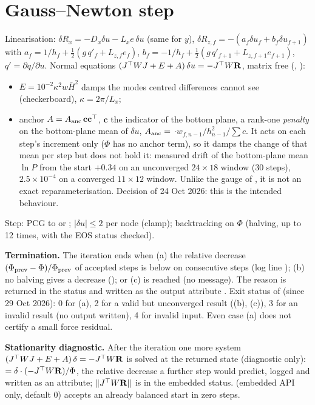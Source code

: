 \section{Gauss--Newton step}
Linearisation: $\delta R_x=-D_x\delta u-L_xe\,\delta u$ (same for $y$),
$\delta R_{z,f}=-(a_f\delta u_f+b_f\delta u_{f+1})$ with
$a_f=1/h_f+\tfrac12(g\,q'_f+L_{z,f}e_f)$, $b_f=-1/h_f+\tfrac12(g\,q'_{f+1}+L_{z,f+1}e_{f+1})$, $q'=\partial q/\partial u$.
Normal equations $(J^\top WJ+E+A)\,\delta u=-J^\top W\mathbf R$, matrix free (, ):
\begin{itemize}
\item $E=10^{-2}\kappa^2w\bar H^2$ damps the modes centred differences cannot see (checkerboard), $\kappa=2\pi/L_x$;
\item anchor $A=A_{\rm anc}\,\mathbf c\mathbf c^\top$, $\mathbf c$ the indicator of the bottom plane, a rank-one
\emph{penalty} on the bottom-plane mean of $\delta u$, $A_{\rm anc}=$ $\cdot w_{f,n-1}/h_{n-1}^2/\sum c$. It acts
on each step's increment only ($\Phi$ has no anchor term), so it damps the change of that mean per step but does not hold it:
measured drift of the bottom-plane mean $\ln P$ from the start $+0.34$ on an unconverged $24\times18$ window (30 steps),
$2.5\times10^{-4}$ on a converged $11\times12$ window. Unlike the gauge of , it is not an exact
reparameterisation. Decision of 24 Oct 2026: this is the intended behaviour.
\end{itemize}
Step: PCG to  or ; $|\delta u|\le2$ per node (clamp); backtracking on $\Phi$ (halving, up to
12 times, with the EOS status checked).

\textbf{Termination.} The iteration ends when (a) the relative decrease $(\Phi_{\rm prev}-\Phi)/\Phi_{\rm prev}$ of accepted
steps is below  on  consecutive steps (log line ); (b) no halving gives a
decrease (); or (c)  is reached (no message). The reason is returned in the status and written as the output attribute
. Exit status of  (since 29 Oct 2026): 0 for (a), 2 for a valid but unconverged result
((b), (c)), 3 for an invalid result (no output written), 4 for invalid input. Even case (a) does not certify a small force
residual.

\textbf{Stationarity diagnostic.} After the iteration one more system $(J^\top WJ+E+A)\,\delta=-J^\top W\mathbf R$ is solved at the
returned state (diagnostic only):  $=\delta\cdot(-J^\top W\mathbf R)/\Phi$, the relative decrease a further
step would predict, logged and written as an attribute; $\|J^\top W\mathbf R\|$ is in the embedded status. 
(embedded API only, default 0) accepts an already balanced start in zero steps.

